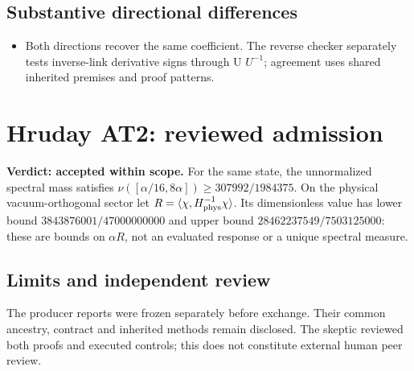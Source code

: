 
\par{}

\subsection*{Substantive directional differences}

\begin{itemize}

\item Both directions recover the same coefficient. The reverse checker separately tests inverse-link derivative signs through U \(U^{-1}\); agreement uses shared inherited premises and proof patterns.

\end{itemize}

\clearpage

\clearpage

\clearpage\section{Hruday AT2: reviewed admission}

\label{stmt:AT2}

\textbf{Verdict: accepted within scope.} For the same state, the unnormalized spectral mass satisfies $\nu([\alpha/16,8\alpha])\ge307992/1984375$. On the physical vacuum-orthogonal sector let $R=\langle\chi,H_{\rm phys}^{-1}\chi\rangle$. Its dimensionless value has lower bound $3843876001/47000000000$ and upper bound $28462237549/7503125000$: these are bounds on $\alpha R$, not an evaluated response or a unique spectral measure.

\subsection*{Limits and independent review}

The producer reports were frozen separately before exchange. Their common ancestry, contract and inherited methods remain disclosed. The skeptic reviewed both proofs and executed controls; this does not constitute external human peer review.

